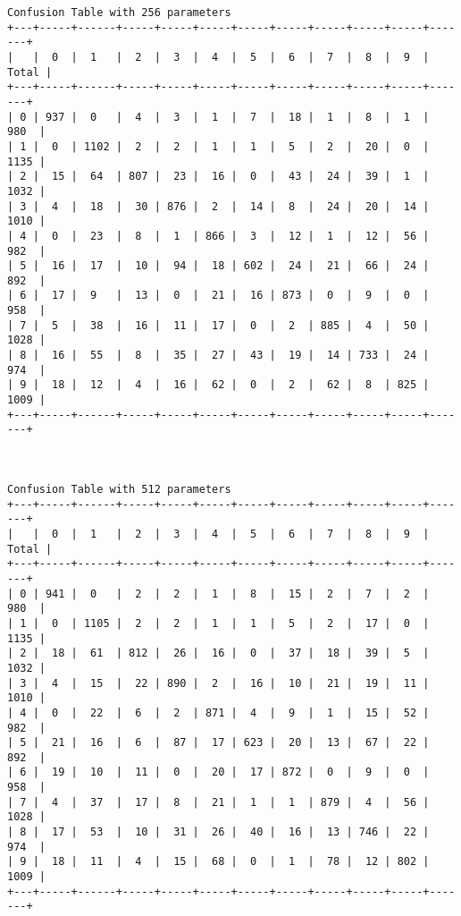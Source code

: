 \documentclass[11pt]{article}
\begin{document}
\begin{Verbatim}[commandchars=\\\{\}]
Confusion Table with 256 parameters
+---+-----+------+-----+-----+-----+-----+-----+-----+-----+-----+-------+
|   |  0  |  1   |  2  |  3  |  4  |  5  |  6  |  7  |  8  |  9  | Total |
+---+-----+------+-----+-----+-----+-----+-----+-----+-----+-----+-------+
| 0 | 937 |  0   |  4  |  3  |  1  |  7  |  18 |  1  |  8  |  1  |  980  |
| 1 |  0  | 1102 |  2  |  2  |  1  |  1  |  5  |  2  |  20 |  0  |  1135 |
| 2 |  15 |  64  | 807 |  23 |  16 |  0  |  43 |  24 |  39 |  1  |  1032 |
| 3 |  4  |  18  |  30 | 876 |  2  |  14 |  8  |  24 |  20 |  14 |  1010 |
| 4 |  0  |  23  |  8  |  1  | 866 |  3  |  12 |  1  |  12 |  56 |  982  |
| 5 |  16 |  17  |  10 |  94 |  18 | 602 |  24 |  21 |  66 |  24 |  892  |
| 6 |  17 |  9   |  13 |  0  |  21 |  16 | 873 |  0  |  9  |  0  |  958  |
| 7 |  5  |  38  |  16 |  11 |  17 |  0  |  2  | 885 |  4  |  50 |  1028 |
| 8 |  16 |  55  |  8  |  35 |  27 |  43 |  19 |  14 | 733 |  24 |  974  |
| 9 |  18 |  12  |  4  |  16 |  62 |  0  |  2  |  62 |  8  | 825 |  1009 |
+---+-----+------+-----+-----+-----+-----+-----+-----+-----+-----+-------+



Confusion Table with 512 parameters
+---+-----+------+-----+-----+-----+-----+-----+-----+-----+-----+-------+
|   |  0  |  1   |  2  |  3  |  4  |  5  |  6  |  7  |  8  |  9  | Total |
+---+-----+------+-----+-----+-----+-----+-----+-----+-----+-----+-------+
| 0 | 941 |  0   |  2  |  2  |  1  |  8  |  15 |  2  |  7  |  2  |  980  |
| 1 |  0  | 1105 |  2  |  2  |  1  |  1  |  5  |  2  |  17 |  0  |  1135 |
| 2 |  18 |  61  | 812 |  26 |  16 |  0  |  37 |  18 |  39 |  5  |  1032 |
| 3 |  4  |  15  |  22 | 890 |  2  |  16 |  10 |  21 |  19 |  11 |  1010 |
| 4 |  0  |  22  |  6  |  2  | 871 |  4  |  9  |  1  |  15 |  52 |  982  |
| 5 |  21 |  16  |  6  |  87 |  17 | 623 |  20 |  13 |  67 |  22 |  892  |
| 6 |  19 |  10  |  11 |  0  |  20 |  17 | 872 |  0  |  9  |  0  |  958  |
| 7 |  4  |  37  |  17 |  8  |  21 |  1  |  1  | 879 |  4  |  56 |  1028 |
| 8 |  17 |  53  |  10 |  31 |  26 |  40 |  16 |  13 | 746 |  22 |  974  |
| 9 |  18 |  11  |  4  |  15 |  68 |  0  |  1  |  78 |  12 | 802 |  1009 |
+---+-----+------+-----+-----+-----+-----+-----+-----+-----+-----+-------+




\end{Verbatim}
\end{document}
